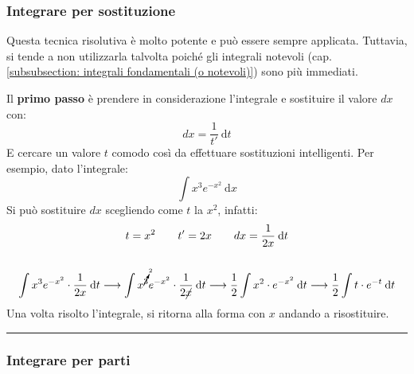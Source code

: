\documentclass[a4paper]{article}
\newcommand{\longline}{\noindent\rule{\textwidth}{0.4pt}}
\begin{document}
	\subsubsection{Integrare per sostituzione}\label{subsubsection: integrale per sostituzione}

	Questa tecnica risolutiva è molto potente e può essere sempre applicata. Tuttavia, si tende a non utilizzarla talvolta poiché gli integrali notevoli (cap. \ref{subsubsection: integrali fondamentali (o notevoli)}) sono più immediati.\newline

	\noindent
	Il \textbf{primo passo} è prendere in considerazione l'integrale e sostituire il valore $dx$ con:
	\begin{equation*}
		dx = \dfrac{1}{t'} \: \mathrm{d}t
	\end{equation*}
	E cercare un valore $t$ comodo così da effettuare sostituzioni intelligenti. Per esempio, dato l'integrale:
	\begin{equation*}
		\displaystyle\int x^{3}e^{-x^{2}} \: \mathrm{d}x
	\end{equation*}
	Si può sostituire $dx$ scegliendo come $t$ la $x^{2}$, infatti:
	\begin{gather*}
		t = x^{2} \hspace{2em} t' = 2x \hspace{2em} dx = \dfrac{1}{2x} \: \mathrm{d}t \\ \\
		\displaystyle\int x^{3}e^{-x^{2}} \cdot \dfrac{1}{2x} \: \mathrm{d}t
		\longrightarrow
		\displaystyle\int x^{\cancelto{2}{3}}e^{-x^{2}} \cdot \dfrac{1}{2\cancel{x}} \: \mathrm{d}t
		\longrightarrow
		\displaystyle\dfrac{1}{2}\int x^{2} \cdot e^{-x^{2}} \: \mathrm{d}t
		\longrightarrow
		\displaystyle\dfrac{1}{2}\int t \cdot e^{-t} \: \mathrm{d}t
	\end{gather*}
	Una volta risolto l'integrale, si ritorna alla forma con $x$ andando a risostituire.
	
	\longline

	\subsubsection{Integrare per parti}
\end{document}
